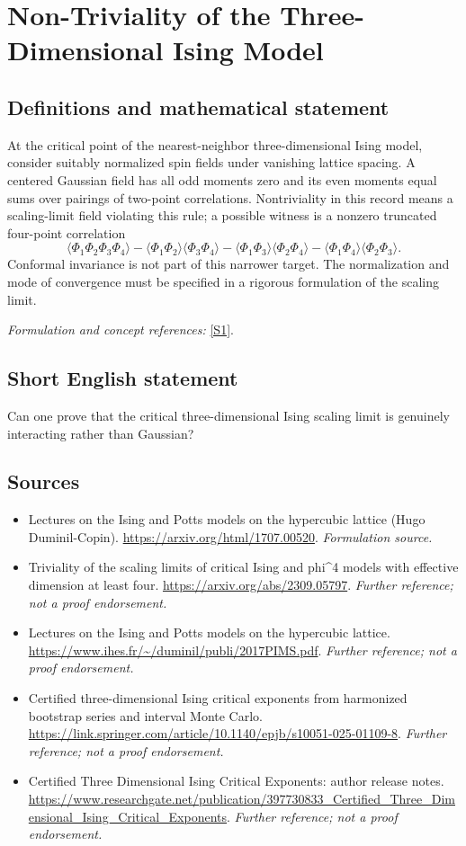\documentclass[11pt]{article}
\begin{document}
\section*{\texorpdfstring{Non-Triviality of the Three-Dimensional Ising Model}{Non-Triviality of the Three-Dimensional Ising Model}}\label{statement}
\subsection{Definitions and mathematical statement}
At the critical point of the nearest-neighbor three-dimensional Ising model, consider suitably normalized spin fields under vanishing lattice spacing. A centered Gaussian field has all odd moments zero and its even moments equal sums over pairings of two-point correlations. Nontriviality in this record means a scaling-limit field violating this rule; a possible witness is a nonzero truncated four-point correlation
\[
 \langle\Phi_1\Phi_2\Phi_3\Phi_4\rangle
 -\langle\Phi_1\Phi_2\rangle\langle\Phi_3\Phi_4\rangle
 -\langle\Phi_1\Phi_3\rangle\langle\Phi_2\Phi_4\rangle
 -\langle\Phi_1\Phi_4\rangle\langle\Phi_2\Phi_3\rangle.
\]
Conformal invariance is not part of this narrower target. The normalization and mode of convergence must be specified in a rigorous formulation of the scaling limit.
\par\smallskip\textit{Formulation and concept references:} \href{https://arxiv.org/html/1707.00520}{[S1]}.

\subsection{Short English statement}
Can one prove that the critical three-dimensional Ising scaling limit is genuinely interacting rather than Gaussian?
\subsection{Sources}
\begin{itemize}
\item[S1]Lectures on the Ising and Potts models on the hypercubic lattice (Hugo Duminil-Copin).
\url{https://arxiv.org/html/1707.00520}.
\textit{Formulation source.}
\item[S2]Triviality of the scaling limits of critical Ising and phi\textasciicircum{}4 models with effective dimension at least four.
\url{https://arxiv.org/abs/2309.05797}.
\textit{Further reference; not a proof endorsement.}
\item[S3]Lectures on the Ising and Potts models on the hypercubic lattice.
\url{https://www.ihes.fr/~/duminil/publi/2017PIMS.pdf}.
\textit{Further reference; not a proof endorsement.}
\item[S4]Certified three-dimensional Ising critical exponents from harmonized bootstrap series and interval Monte Carlo.
\url{https://link.springer.com/article/10.1140/epjb/s10051-025-01109-8}.
\textit{Further reference; not a proof endorsement.}
\item[S5]Certified Three Dimensional Ising Critical Exponents: author release notes.
\url{https://www.researchgate.net/publication/397730833_Certified_Three_Dimensional_Ising_Critical_Exponents}.
\textit{Further reference; not a proof endorsement.}
\end{itemize}
\end{document}
